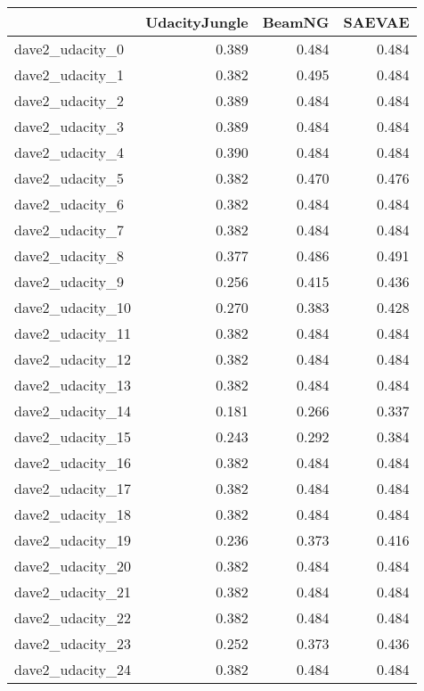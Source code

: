 \begin{tabular}{lrrr}
\toprule
{} &  UdacityJungle &  BeamNG &  SAEVAE \\
\midrule
dave2\_udacity\_0   &          0.389 &   0.484 &   0.484 \\
dave2\_udacity\_1   &          0.382 &   0.495 &   0.484 \\
dave2\_udacity\_2   &          0.389 &   0.484 &   0.484 \\
dave2\_udacity\_3   &          0.389 &   0.484 &   0.484 \\
dave2\_udacity\_4   &          0.390 &   0.484 &   0.484 \\
dave2\_udacity\_5   &          0.382 &   0.470 &   0.476 \\
dave2\_udacity\_6   &          0.382 &   0.484 &   0.484 \\
dave2\_udacity\_7   &          0.382 &   0.484 &   0.484 \\
dave2\_udacity\_8   &          0.377 &   0.486 &   0.491 \\
dave2\_udacity\_9   &          0.256 &   0.415 &   0.436 \\
dave2\_udacity\_10  &          0.270 &   0.383 &   0.428 \\
dave2\_udacity\_11  &          0.382 &   0.484 &   0.484 \\
dave2\_udacity\_12  &          0.382 &   0.484 &   0.484 \\
dave2\_udacity\_13  &          0.382 &   0.484 &   0.484 \\
dave2\_udacity\_14  &          0.181 &   0.266 &   0.337 \\
dave2\_udacity\_15  &          0.243 &   0.292 &   0.384 \\
dave2\_udacity\_16  &          0.382 &   0.484 &   0.484 \\
dave2\_udacity\_17  &          0.382 &   0.484 &   0.484 \\
dave2\_udacity\_18  &          0.382 &   0.484 &   0.484 \\
dave2\_udacity\_19  &          0.236 &   0.373 &   0.416 \\
dave2\_udacity\_20  &          0.382 &   0.484 &   0.484 \\
dave2\_udacity\_21  &          0.382 &   0.484 &   0.484 \\
dave2\_udacity\_22  &          0.382 &   0.484 &   0.484 \\
dave2\_udacity\_23  &          0.252 &   0.373 &   0.436 \\
dave2\_udacity\_24  &          0.382 &   0.484 &   0.484 \\

\end{tabular}
